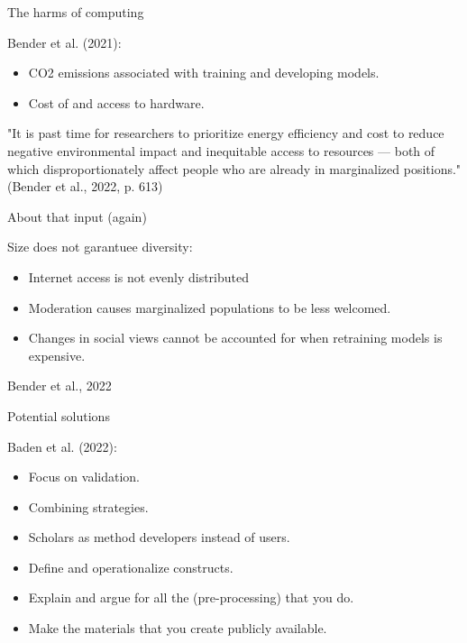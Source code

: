 \documentclass[compress]{beamer}
\begin{document}
\begin{frame}{The harms of computing}
	
\begin{alertblock}{Bender et al. (2021):}
\begin{itemize}
	\item CO2 emissions associated with training and developing models.
	\item Cost of and access to hardware.
\end{itemize}
\end{alertblock}
"It is past time for researchers to prioritize energy efficiency and cost to reduce negative environmental impact and inequitable access to resources — both of which disproportionately affect people who are already in marginalized positions." (Bender et al., 2022, p. 613)
\end{frame}


\begin{frame}{About that input (again)}
	
\begin{alertblock}{Size does not garantuee diversity:}
\begin{itemize}
	\item Internet access is not evenly distributed
	\item Moderation causes marginalized populations to be less welcomed.
	\item Changes in social views cannot be accounted for when retraining models is expensive. 
\end{itemize}
\end{alertblock}
Bender et al., 2022
\end{frame}



\begin{frame}{Potential solutions}
	
\begin{alertblock}{Baden et al. (2022):}
\begin{itemize}
	\item Focus on validation.
	\item Combining strategies.
	\item Scholars as method developers instead of users.
	\item Define and operationalize constructs.
	\item Explain and argue for all the (pre-processing) that you do.
	\item Make the materials that you create publicly available.
\end{itemize}
\end{alertblock}

\end{frame}
\end{document}
